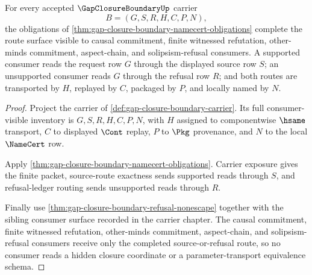 \begin{theorem}
\label{thm:gap-closure-boundary-namecert-route-completion}
For every accepted $\GapClosureBoundaryUp$ carrier
$$
B=(G,S,R,H,C,P,N),
$$
the obligations of \autoref{thm:gap-closure-boundary-namecert-obligations} complete the route surface visible to causal commitment, finite witnessed refutation, other-minds commitment, aspect-chain, and solipsism-refusal consumers. A supported consumer reads the request row $G$ through the displayed source row $S$; an unsupported consumer reads $G$ through the refusal row $R$; and both routes are transported by $H$, replayed by $C$, packaged by $P$, and locally named by $N$.
\end{theorem}
\begin{proof}
Project the carrier of \autoref{def:gap-closure-boundary-carrier}. Its full consumer-visible inventory is $G,S,R,H,C,P,N$, with $H$ assigned to componentwise $\hsame$ transport, $C$ to displayed $\Cont$ replay, $P$ to $\Pkg$ provenance, and $N$ to the local $\NameCert$ row.

Apply \autoref{thm:gap-closure-boundary-namecert-obligations}. Carrier exposure gives the finite packet, source-route exactness sends supported reads through $S$, and refusal-ledger routing sends unsupported reads through $R$.

Finally use \autoref{thm:gap-closure-boundary-refusal-nonescape} together with the sibling consumer surface recorded in the carrier chapter. The causal commitment, finite witnessed refutation, other-minds commitment, aspect-chain, and solipsism-refusal consumers receive only the completed source-or-refusal route, so no consumer reads a hidden closure coordinate or a parameter-transport equivalence schema.
\end{proof}


